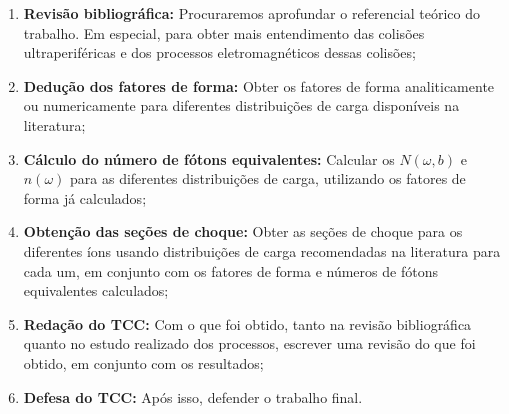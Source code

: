 \begin{enumerate}
	\item \textbf{Revisão bibliográfica:} Procuraremos aprofundar o referencial
	teórico do trabalho. Em especial, para obter mais entendimento das
	colisões ultraperiféricas e dos processos eletromagnéticos dessas
	colisões;
	\item \textbf{Dedução dos fatores de forma:} Obter os fatores de forma
	analiticamente ou numericamente para diferentes distribuições de carga
	disponíveis na literatura;
	\item \textbf{Cálculo do número de fótons equivalentes:} Calcular os
	$N(\omega , b)$ e $n(\omega)$ para as diferentes distribuições de
	carga, utilizando os fatores de forma já calculados;
	\item \textbf{Obtenção das seções de choque:} Obter as seções de choque
	para os diferentes íons usando distribuições de carga recomendadas na
	literatura para cada um, em conjunto com os fatores de forma e números
	de fótons equivalentes calculados;
	\item \textbf{Redação do TCC:} Com o que foi obtido, tanto na revisão
	bibliográfica quanto no estudo realizado dos processos, escrever uma
	revisão do que foi obtido, em conjunto com os resultados;
	\item \textbf{Defesa do TCC:} Após isso, defender o trabalho final.
\end{enumerate}

